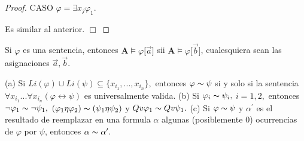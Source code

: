 \begin{proof}
    CASO \(\varphi =\exists x_{j}\varphi _{1}\).

    Es similar al anterior. \(\Box\)
  \end{proof}

  \begin{corollary}
    Si \(\varphi \) es una sentencia, entonces \(\mathbf{A}\models \varphi \lbrack \vec{a}]\) sii \(\mathbf{A}\models \varphi \lbrack \vec{b}]\), cualesquiera sean las asignaciones \(\vec{a},\vec{b}\).
  \end{corollary}

  \begin{lemma}
    (a) Si \(Li(\varphi )\cup Li(\psi )\subseteq \{x_{i_{1}},...,x_{i_{n}}\},\) entonces \(\varphi \thicksim \psi \) si y solo si la sentencia \(\forall x_{i_{1}}...\forall x_{i_{n}}(\varphi \leftrightarrow \psi )\) es universalmente valida.
    (b) Si \(\varphi _{i}\thicksim \psi _{i},\) \(i=1,2,\) entonces \(\lnot \varphi _{1}\thicksim \lnot \psi _{1},\) \((\varphi _{1}\eta \varphi _{2})\thicksim (\psi _{1}\eta \psi _{2})\) y \(Qv\varphi _{1}\thicksim Qv\psi _{1}.\)
    (c) Si \(\varphi \thicksim \psi \) y \(\alpha ^{\prime }\) es el resultado de reemplazar en una formula \(\alpha \) algunas (posiblemente \(0\)) ocurrencias de \(\varphi \) por \(\psi \), entonces \(\alpha \thicksim \alpha ^{\prime }.\)
  \end{lemma}
